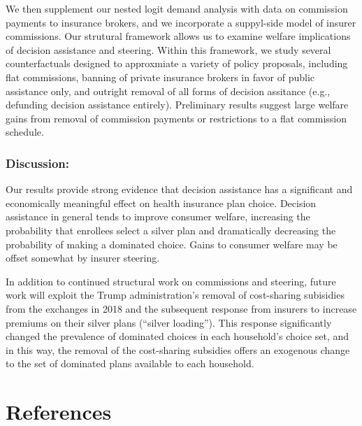 \documentclass[
  11pt,
]{article}
\begin{document}
We then supplement our nested logit demand analysis with data on commission payments to insurance brokers, and we incorporate a suppyl-side model of insurer commissions. Our strutural framework allows us to examine welfare implications of decision assistance and steering. Within this framework, we study several counterfactuals designed to approxmiate a variety of policy proposals, including flat commissions, banning of private insurance brokers in favor of public assistance only, and outright removal of all forms of decision assitance (e.g., defunding decision assistance entirely). Preliminary results suggest large welfare gains from removal of commission payments or restrictions to a flat commission schedule.

\hypertarget{discussion}{%
\subsubsection{Discussion:}\label{discussion}}

Our results provide strong evidence that decision assistance has a significant and economically meaningful effect on health insurance plan choice. Decision assistance in general tends to improve consumer welfare, increasing the probability that enrollees select a silver plan and dramatically decreasing the probability of making a dominated choice. Gains to consumer welfare may be offset somewhat by insurer steering.

In addition to continued structural work on commissions and steering, future work will exploit the Trump administration's removal of cost-sharing subisidies from the exchanges in 2018 and the subsequent response from insurers to increase premiums on their silver plans (``silver loading''). This response significantly changed the prevalence of dominated choices in each household's choice set, and in this way, the removal of the cost-sharing subsidies offers an exogenous change to the set of dominated plans available to each household.

\hypertarget{references}{%
\section*{References}\label{references}}
\end{document}

